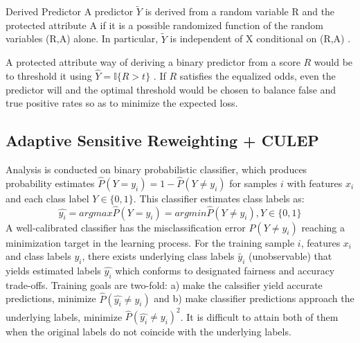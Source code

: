 \documentclass[runningheads]{llncs}
\begin{document}
\begin{definition}{Derived Predictor}
A predictor $\tilde{Y}$ is derived from a random variable R and the protected attribute A if it is a possible randomized function of the random variables (R,A) alone. In particular, $\tilde{Y}$ is independent of X conditional on (R,A) \cite{hardt2016equality}.
\end{definition}
A protected attribute way of deriving a binary predictor from a score $R$ would be to threshold it using $\hat{Y} = \mathbb{I}\{R > t\}$ \cite{hardt2016equality}. If $R$ satisfies the equalized odds, even the predictor will and the optimal threshold would be chosen to balance false and true positive rates so as to minimize the expected loss.
\subsection{Adaptive Sensitive Reweighting + CULEP}
Analysis is conducted on binary probabilistic classifier, which produces probability estimates $\hat{P}(Y=y_i) = 1 - \hat{P}(Y \ne y_i)$ for samples $i$ with features $x_i$ and each class label $Y \in \{0,1\}$. This classifier estimates class labels as:
\begin{equation}
\hat{y_i} = argmax\hat{P}(Y=y_i) = argmin\hat{P}(Y \ne y_i) , Y \in \{0,1\}
\end{equation}
A well-calibrated classifier has the misclassification error $P(Y \ne y_i)$ reaching a minimization target in the learning process. For the training sample $i$, features $x_i$ and class labels $y_i$, there exists underlying class labels $\tilde{y_i}$ (unobservable) that yields estimated labels $\hat{y_i}$ which conforms to designated fairness and accuracy trade-offs. Training goals are two-fold: a) make the calssifier yield accurate predictions, minimize $\hat{P}(\hat{y_i} \ne y_i)$ and b) make classifier predictions approach the underlying labels, minimize ${\hat{P}(\hat{y_i} \ne y_i)}^2$. It is difficult to attain both of them when the original labels do not coincide with the underlying labels. 
\end{document}
